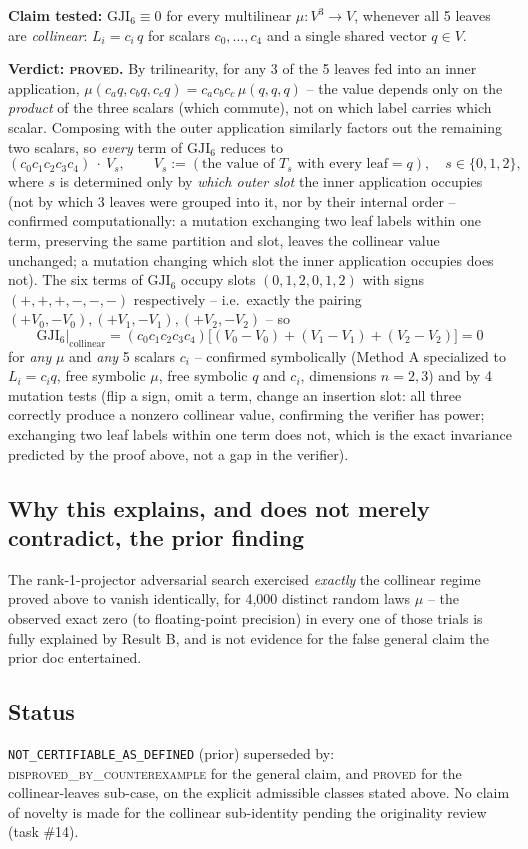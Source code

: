 \textbf{Claim tested:} $\mathrm{GJI}_6 \equiv 0$ for every multilinear
$\mu:V^3\to V$, whenever all 5 leaves are \emph{collinear}:
$L_i = c_i\, q$ for scalars $c_0,\dots,c_4$ and a single shared vector
$q\in V$.

\textbf{Verdict: \textsc{proved}.} By trilinearity, for any 3 of the 5
leaves fed into an inner application, $\mu(c_a q, c_b q, c_c q) =
c_a c_b c_c\,\mu(q,q,q)$ -- the value depends only on the \emph{product}
of the three scalars (which commute), not on which label carries which
scalar. Composing with the outer application similarly factors out the
remaining two scalars, so \emph{every} term of $\mathrm{GJI}_6$ reduces to
\[
  (c_0 c_1 c_2 c_3 c_4)\ \cdot\ V_s, \qquad
  V_s := (\text{the value of } T_s \text{ with every leaf} = q),
  \quad s\in\{0,1,2\},
\]
where $s$ is determined only by \emph{which outer slot} the inner
application occupies (not by which 3 leaves were grouped into it, nor by
their internal order -- confirmed computationally: a mutation exchanging
two leaf labels within one term, preserving the same partition and slot,
leaves the collinear value unchanged; a mutation changing which slot the
inner application occupies does not). The six terms of $\mathrm{GJI}_6$
occupy slots $(0,1,2,0,1,2)$ with signs $(+,+,+,-,-,-)$ respectively --
i.e.\ exactly the pairing $(+V_0,-V_0), (+V_1,-V_1), (+V_2,-V_2)$ -- so
\[
  \mathrm{GJI}_6 \Big|_{\text{collinear}} =
  (c_0c_1c_2c_3c_4)\big[(V_0 - V_0) + (V_1 - V_1) + (V_2 - V_2)\big] = 0
\]
for \emph{any} $\mu$ and \emph{any} 5 scalars $c_i$ -- confirmed
symbolically (Method A specialized to $L_i = c_i q$, free symbolic $\mu$,
free symbolic $q$ and $c_i$, dimensions $n=2,3$) and by 4 mutation tests
(flip a sign, omit a term, change an insertion slot: all three correctly
produce a nonzero collinear value, confirming the verifier has power;
exchanging two leaf labels within one term does not, which is the exact
invariance predicted by the proof above, not a gap in the verifier).

\subsection*{Why this explains, and does not merely contradict, the prior finding}

The rank-1-projector adversarial search exercised \emph{exactly} the
collinear regime proved above to vanish identically, for 4{,}000 distinct
random laws $\mu$ -- the observed exact zero (to floating-point precision)
in every one of those trials is fully explained by Result B, and is not
evidence for the false general claim the prior doc entertained.

\subsection*{Status}

\texttt{NOT\_CERTIFIABLE\_AS\_DEFINED} (prior) superseded by:
\textsc{disproved\_by\_counterexample} for the general claim, and
\textsc{proved} for the collinear-leaves sub-case, on the explicit
admissible classes stated above. No claim of novelty is made for the
collinear sub-identity pending the originality review (task \#14).
